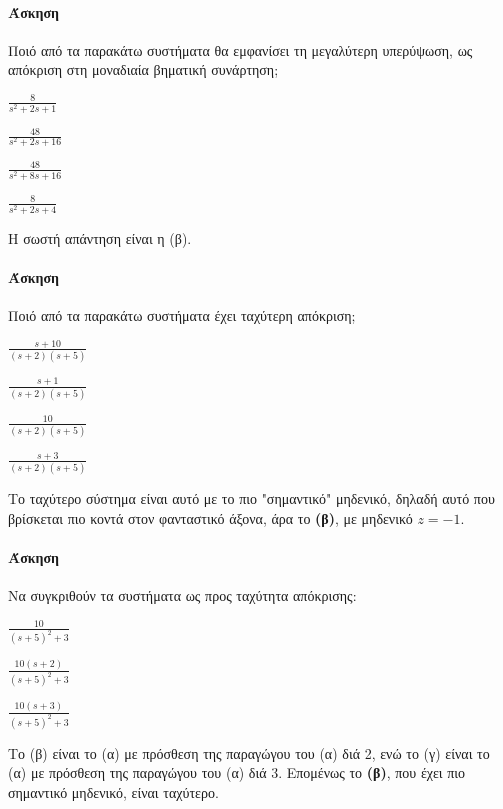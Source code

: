\documentclass[11pt,a4paper,notitlepage,fleqn,draft]{article}
\begin{document}
\paragraph{Άσκηση}
Ποιό από τα παρακάτω συστήματα θα εμφανίσει τη μεγαλύτερη υπερύψωση, ως απόκριση στη μοναδιαία
βηματική συνάρτηση;
\begin{enumgreekparen}
	\item \( \displaystyle \frac{8}{s^2+2s+1} \)
	\item \( \displaystyle \frac{48}{s^2+2s+16} \)
	\item \( \displaystyle \frac{48}{s^2+8s+16} \)
	\item \( \displaystyle \frac{8}{s^2+2s+4} \)
\end{enumgreekparen}

Η σωστή απάντηση είναι η (β).


\paragraph{Άσκηση}
Ποιό από τα παρακάτω συστήματα έχει ταχύτερη απόκριση;
\begin{enumgreekparen}
	\item \( \displaystyle \frac{s+10}{(s+2)(s+5)} \)
	\item \( \displaystyle \frac{s+1}{(s+2)(s+5)} \)
	\item \( \displaystyle \frac{10}{(s+2)(s+5)} \)
	\item \( \displaystyle \frac{s+3}{(s+2)(s+5)} \)
\end{enumgreekparen}

Το ταχύτερο σύστημα είναι αυτό με το πιο "σημαντικό" μηδενικό, δηλαδή αυτό που βρίσκεται πιο
κοντά στον φανταστικό άξονα, άρα το \textbf{(β)}, με μηδενικό \( z = -1 \).

\paragraph{Άσκηση}
Να συγκριθούν τα συστήματα ως προς ταχύτητα απόκρισης:
\begin{enumgreekparen}
	\item \( \displaystyle \frac{10}{(s+5)^2+3} \)
	\item \( \displaystyle \frac{10(s+2)}{(s+5)^2+3} \)
	\item \( \displaystyle \frac{10(s+3)}{(s+5)^2+3} \)
\end{enumgreekparen}

Το (β) είναι το (α) με πρόσθεση της παραγώγου του (α) διά 2, ενώ το (γ) είναι το (α) με
πρόσθεση της παραγώγου του (α) διά 3. Επομένως το \textbf{(β)}, που έχει πιο σημαντικό
μηδενικό, είναι ταχύτερο.
\end{document}
